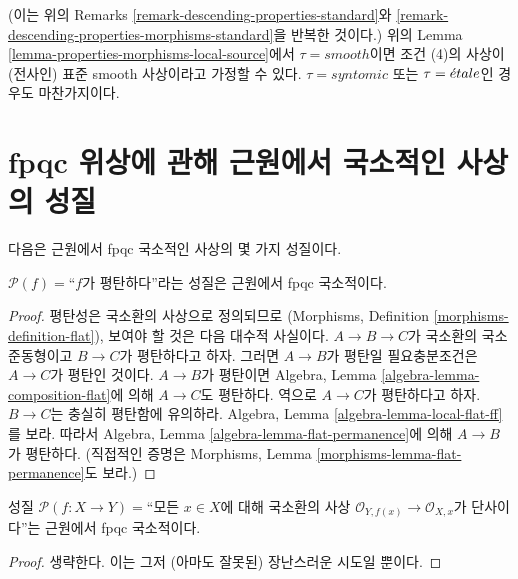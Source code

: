 \begin{remark}
\label{remark-properties-morphisms-local-source-standard}
(이는 위의 Remarks \ref{remark-descending-properties-standard}와
\ref{remark-descending-properties-morphisms-standard}을 반복한 것이다.)
위의 Lemma \ref{lemma-properties-morphisms-local-source}에서
$\tau = smooth$이면 조건 (4)의 사상이 (전사인) 표준 smooth 사상이라고
가정할 수 있다. $\tau = syntomic$ 또는 $\tau = {\acute{e}tale}$인 경우도
마찬가지이다.
\end{remark}



\section{fpqc 위상에 관해 근원에서 국소적인 사상의 성질}
\label{section-fpqc-local-source}

\noindent
다음은 근원에서 fpqc 국소적인 사상의 몇 가지 성질이다.

\begin{lemma}
\label{lemma-flat-fpqc-local-source}
$\mathcal{P}(f)=$``$f$가 평탄하다''라는 성질은 근원에서 fpqc 국소적이다.
\end{lemma}

\begin{proof}
평탄성은 국소환의 사상으로 정의되므로
(Morphisms, Definition \ref{morphisms-definition-flat}),
보여야 할 것은 다음 대수적 사실이다. $A \to B \to C$가 국소환의
국소 준동형이고 $B \to C$가 평탄하다고 하자. 그러면 $A \to B$가
평탄일 필요충분조건은 $A \to C$가 평탄인 것이다.
$A \to B$가 평탄이면 Algebra, Lemma
\ref{algebra-lemma-composition-flat}에 의해 $A \to C$도 평탄하다.
역으로 $A \to C$가 평탄하다고 하자. $B \to C$는 충실히 평탄함에
유의하라. Algebra, Lemma \ref{algebra-lemma-local-flat-ff}를 보라.
따라서 Algebra, Lemma \ref{algebra-lemma-flat-permanence}에 의해
$A \to B$가 평탄하다. (직접적인 증명은 Morphisms, Lemma
\ref{morphisms-lemma-flat-permanence}도 보라.)
\end{proof}

\begin{lemma}
\label{lemma-injective-local-rings-fpqc-local-source}
성질
$\mathcal{P}(f : X \to Y)=$``모든 $x \in X$에 대해 국소환의 사상
$\mathcal{O}_{Y, f(x)} \to \mathcal{O}_{X, x}$가 단사이다''는
근원에서 fpqc 국소적이다.
\end{lemma}

\begin{proof}
생략한다. 이는 그저 (아마도 잘못된) 장난스러운 시도일 뿐이다.
\end{proof}





